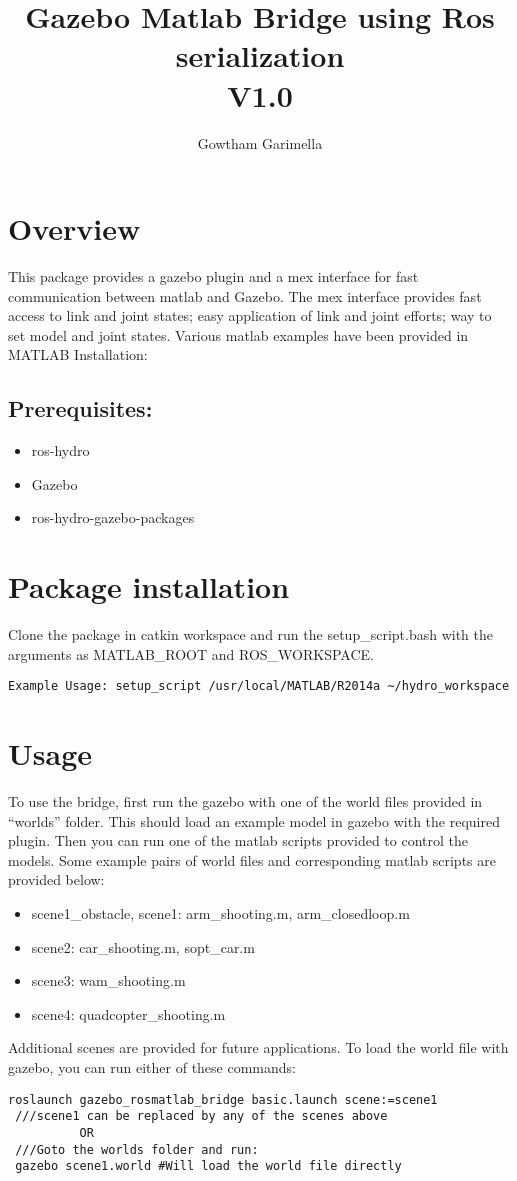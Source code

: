 \documentclass[letterpaper,10pt]{article}
\title{Gazebo Matlab Bridge using Ros serialization \\V1.0} \label{gazebo-matlab-bridge-using-ros-serialization}
\author{Gowtham Garimella}
\begin{document}
\maketitle

\section{Overview}
This package provides a gazebo plugin and a mex interface for fast
communication between matlab and Gazebo. The mex interface provides fast
access to link and joint states; easy application of link and joint
efforts; way to set model and joint states. Various matlab examples have
been provided in MATLAB Installation: 
\subsection{Prerequisites:}
\begin{itemize}
 \item  ros-hydro 
 \item Gazebo 
 \item ros-hydro-gazebo-packages
\end{itemize}

\section{Package installation}
Clone the package in catkin workspace and run the
setup\_script.bash with the arguments as MATLAB\_ROOT and
ROS\_WORKSPACE.
\begin{Verbatim}[frame=single]
Example Usage: setup_script /usr/local/MATLAB/R2014a ~/hydro_workspace
\end{Verbatim}
\section{Usage} 
To use the bridge, first run the gazebo with one of the world files provided in ``worlds''
folder. This should load an example model in gazebo with the required
plugin. Then you can run one of the matlab scripts provided to control
the models. Some example pairs of world files and corresponding matlab
scripts are provided below: 
\begin{itemize}
 \item scene1\_obstacle, scene1: arm\_shooting.m, arm\_closedloop.m 
 \item scene2: car\_shooting.m, sopt\_car.m 
 \item scene3: wam\_shooting.m 
 \item scene4: quadcopter\_shooting.m
\end{itemize}
Additional scenes are provided for future applications. To load the
world file with gazebo, you can run either of these commands: 
\begin{Verbatim}[frame=single]
 roslaunch gazebo_rosmatlab_bridge basic.launch scene:=scene1 
 ///scene1 can be replaced by any of the scenes above 
		  OR
 ///Goto the worlds folder and run:
 gazebo scene1.world #Will load the world file directly
\end{Verbatim}
\end{document}

